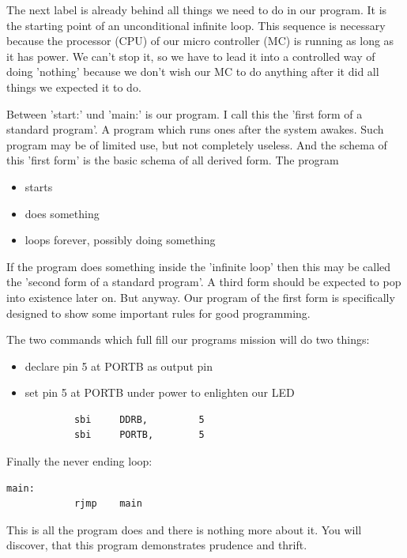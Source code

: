 The next label is already behind all things we need to do in our program. It is the starting point of an unconditional infinite loop. This sequence is necessary because the processor (CPU) of our micro controller (MC) is running as long as it has power. We can't stop it, so we have to lead it into a controlled way of doing 'nothing' because we don't wish our MC to do anything after it did all things we expected it to do.

Between 'start:' und 'main:' is our program. I call this the 'first form of a standard program'. A program which runs ones after the system awakes. Such program may be of limited use, but not completely useless. And the schema of this 'first form' is the basic schema of all derived form. The program 

\begin{itemize}
  \item  starts
  \item  does something
  \item  loops forever, possibly doing something
\end{itemize}

If the program does something inside the 'infinite loop' then this may be called the 'second form of a standard program'. A third form should be expected to pop into existence later on. But anyway. Our program of the first form is specifically designed to show some important rules for good programming.

The two commands which full fill our programs mission will do two things:

\begin{itemize}
  \item  declare pin 5 at PORTB as output pin
  \item  set pin 5 at PORTB under power to enlighten our LED
\end{itemize}

\begin{lstlisting}
            sbi     DDRB,         5
            sbi     PORTB,        5
\end{lstlisting}

Finally the never ending loop:

\begin{lstlisting}
main:
            rjmp    main
\end{lstlisting}

This is all the program does and there is nothing more about it. You will discover, that this program demonstrates prudence and thrift. 


